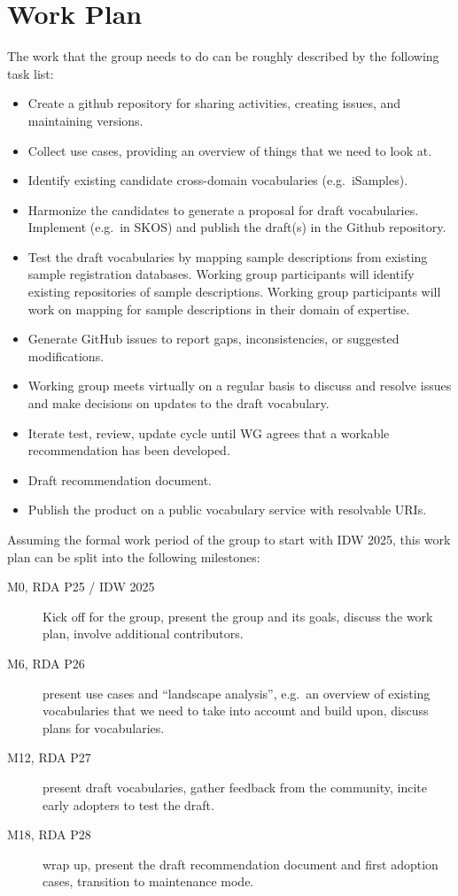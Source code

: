 \documentclass{scrartcl}
\begin{document}
\section{Work Plan}

The work that the group needs to do can be roughly described by the
following task list:
\begin{itemize}
\item Create a github repository for sharing activities, creating
  issues, and maintaining versions.
\item Collect use cases, providing an overview of things that we need
  to look at.
\item Identify existing candidate cross-domain vocabularies
  (e.g.\ iSamples).
\item Harmonize the candidates to generate a proposal for draft
  vocabularies.  Implement (e.g.\ in SKOS) and publish the draft(s) in
  the Github repository.
\item Test the draft vocabularies by mapping sample descriptions from
  existing sample registration databases.  Working group participants
  will identify existing repositories of sample descriptions.  Working
  group participants will work on mapping for sample descriptions in
  their domain of expertise.
\item Generate GitHub issues to report gaps, inconsistencies, or
  suggested modifications.
\item Working group meets virtually on a regular basis to discuss and
  resolve issues and make decisions on updates to the draft
  vocabulary.
\item Iterate test, review, update cycle until WG agrees that a
  workable recommendation has been developed.
\item Draft recommendation document.
\item Publish the product on a public vocabulary service with
  resolvable URIs.
\end{itemize}

Assuming the formal work period of the group to start with IDW 2025,
this work plan can be split into the following milestones:
\begin{description}
\item[M0, RDA P25 / IDW 2025] Kick off for the group, present the
  group and its goals, discuss the work plan, involve additional
  contributors.
\item[M6, RDA P26] present use cases and ``landscape analysis'',
  e.g.\ an overview of existing vocabularies that we need to take into
  account and build upon, discuss plans for vocabularies.
\item[M12, RDA P27] present draft vocabularies, gather feedback from
  the community, incite early adopters to test the draft.
\item[M18, RDA P28] wrap up, present the draft recommendation document
  and first adoption cases, transition to maintenance mode.
\end{description}
\end{document}
